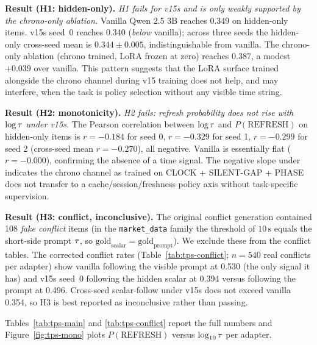 \textbf{Result (H1: hidden-only).} \emph{H1 fails for \CI{} v15s and is only weakly supported by the chrono-only ablation.} Vanilla Qwen 2.5 3B reaches 0.349 on hidden-only items. \CI{} v15s seed~0 reaches 0.340 (\emph{below} vanilla); across three seeds the hidden-only cross-seed mean is $0.344\pm0.005$, indistinguishable from vanilla. The chrono-only ablation (chrono trained, LoRA frozen at zero) reaches 0.387, a modest $+0.039$ over vanilla. This pattern suggests that the LoRA surface trained alongside the chrono channel during v15 training does not help, and may interfere, when the task is policy selection without any visible time string.

\textbf{Result (H2: monotonicity).} \emph{H2 fails: refresh probability does not rise with $\log\tau$ under \CI{} v15s.} The Pearson correlation between $\log\tau$ and $P(\text{REFRESH})$ on hidden-only items is $r=-0.184$ for seed 0, $r=-0.329$ for seed 1, $r=-0.299$ for seed 2 (cross-seed mean $r=-0.270$), all negative. Vanilla is essentially flat ($r=-0.000$), confirming the absence of a time signal. The negative slope under \CI{} indicates the chrono channel as trained on CLOCK + SILENT-GAP + PHASE does not transfer to a cache/session/freshness policy axis without task-specific supervision.

\textbf{Result (H3: conflict, inconclusive).} The original conflict generation contained 108 \emph{fake conflict} items (in the \texttt{market\_data} family the threshold of $10\,\mathrm{s}$ equals the short-side prompt $\tau$, so $\text{gold}_{\text{scalar}}{=}\text{gold}_{\text{prompt}}$). We exclude these from the conflict tables. The corrected conflict rates (Table~\ref{tab:tps-conflict}; $n=540$ real conflicts per adapter) show vanilla following the visible prompt at 0.530 (the only signal it has) and \CI{} v15s seed~0 following the hidden scalar at 0.394 versus following the prompt at 0.496. Cross-seed scalar-follow under \CI{} v15s does not exceed vanilla 0.354, so H3 is best reported as inconclusive rather than passing.

Tables~\ref{tab:tps-main} and \ref{tab:tps-conflict} report the full numbers and Figure~\ref{fig:tps-mono} plots $P(\text{REFRESH})$ versus $\log_{10}\tau$ per adapter.

